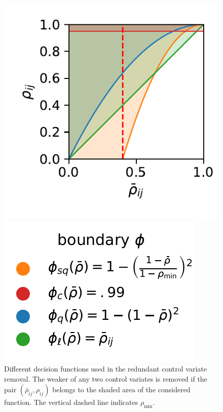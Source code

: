 \begin{figure}[htb]
  \centering
  \begin{minipage}{.6\textwidth}
    \centering
    \includegraphics[scale=.6]{gfx/decision_funcs.pdf}
  \end{minipage}
  \hspace{-2.8em}
  \begin{minipage}{.3\textwidth}
    \includegraphics[scale=.6]{gfx/legend_1.pdf} \vfill
  \end{minipage}
  \caption[\ac{CV} redundancy heuristics]{Different decision functions
    used in the redundant control  variate removal. The weaker of any
    two control  variates is removed if
    the pair $(\bar\rho_{ij}, \rho_{ij})$ belongs to the shaded area
    of the considered function.
  The vertical dashed line indicates $\rho_{\min}$.\label{fig:decision}}
\end{figure}

